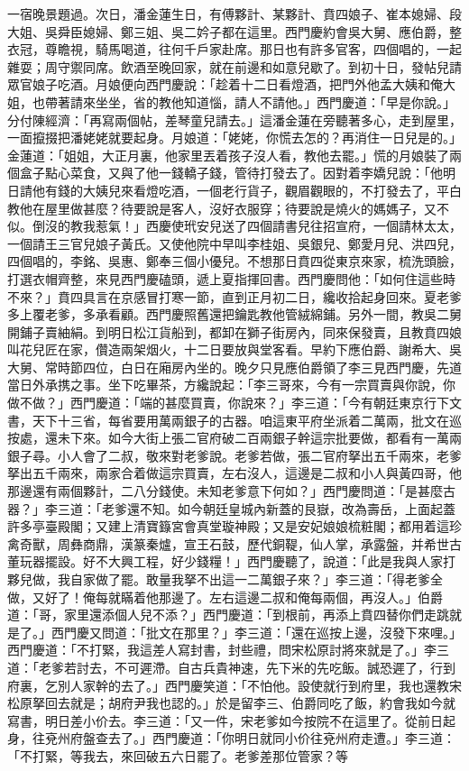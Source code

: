 \begin{showcontents}{}
一宿晚景題過。次日，潘金蓮生日，有傅夥計、某夥計、賁四娘子、崔本媳婦、段大姐、吳舜臣媳婦、鄭三姐、吳二妗子都在這里。西門慶約會吳大舅、應伯爵，整衣冠，尊瞻視，騎馬喝道，往何千戶家赴席。那日也有許多官客，四個唱的，一起雜耍；周守禦同席。飲酒至晚回家，就在前邊和如意兒歇了。到初十日，發帖兒請眾官娘子吃酒。月娘便向西門慶說：「趁着十二日看燈酒，把門外他孟大姨和俺大姐，也帶著請來坐坐，省的教他知道惱，請人不請他。」西門慶道：「早是你說。」分付陳經濟：「再寫兩個帖，差琴童兒請去。」這潘金蓮在旁聽著多心，走到屋里，一面攛掇把潘姥姥就要起身。月娘道：「姥姥，你慌去怎的？再消住一日兒是的。」金蓮道：「姐姐，大正月裏，他家里丟着孩子沒人看，教他去罷。」慌的月娘裝了兩個盒子點心菜食，又與了他一錢轎子錢，管待打發去了。因對着李嬌兒說：「他明日請他有錢的大姨兒來看燈吃酒，一個老行貨子，觀眉觀眼的，不打發去了，平白教他在屋里做甚麼？待要說是客人，沒好衣服穿；待要說是燒火的媽媽子，又不似。倒沒的教我惹氣！」西慶使玳安兒送了四個請書兒往招宣府，一個請林太太，一個請王三官兒娘子黃氏。又使他院中早叫李桂姐、吳銀兒、鄭愛月兒、洪四兒，四個唱的，李銘、吳惠、鄭奉三個小優兒。不想那日賁四從東京來家，梳洗頭臉，打選衣帽齊整，來見西門慶磕頭，遞上夏指揮回書。西門慶問他：「如何住這些時不來？」賁四具言在京感冒打寒一節，直到正月初二日，纔收拾起身回來。夏老爹多上覆老爹，多承看顧。西門慶照舊還把鑰匙教他管絨綿鋪。另外一間，教吳二舅開鋪子賣紬絹。到明日松江貨船到，都卸在獅子街房內，同來保發賣，且教賁四娘叫花兒匠在家，儹造兩架烟火，十二日要放與堂客看。早約下應伯爵、謝希大、吳大舅、常時節四位，白日在廂房內坐的。晚夕只見應伯爵領了李三見西門慶，先道當日外承携之事。坐下吃畢茶，方纔說起：「李三哥來，今有一宗買賣與你說，你做不做？」西門慶道：「端的甚麼買賣，你說來？」李三道：「今有朝廷東京行下文書，天下十三省，每省要用萬兩銀子的古器。咱這東平府坐派着二萬兩，批文在巡按處，還未下來。如今大街上張二官府破二百兩銀子幹這宗批要做，都看有一萬兩銀子尋。小人會了二叔，敬來對老爹說。老爹若做，張二官府拏出五千兩來，老爹拏出五千兩來，兩家合着做這宗買賣，左右沒人，這邊是二叔和小人與黃四哥，他那邊還有兩個夥計，二八分錢使。未知老爹意下何如？」西門慶問道：「是甚麼古器？」李三道：「老爹還不知。如今朝廷皇城內新蓋的艮嶽，改為壽岳，上面起蓋許多亭臺殿閣；又建上清寶籙宮會真堂璇神殿；又是安妃娘娘梳粧閣；都用着這珍禽奇獸，周彝商鼎，漢篆秦爐，宣王石鼓，歷代銅鞮，仙人掌，承露盤，并希世古董玩器擺設。好不大興工程，好少錢糧！」西門慶聽了，說道：「此是我與人家打夥兒做，我自家做了罷。敢量我拏不出這一二萬銀子來？」李三道：「得老爹全做，又好了！俺每就瞞着他那邊了。左右這邊二叔和俺每兩個，再沒人。」伯爵道：「哥，家里還添個人兒不添？」西門慶道：「到根前，再添上賁四替你們走跳就是了。」西門慶又問道：「批文在那里？」李三道：「還在巡按上邊，沒發下來哩。」西門慶道：「不打緊，我這差人寫封書，封些禮，問宋松原討將來就是了。」李三道：「老爹若討去，不可遲滯。自古兵貴神速，先下米的先吃飯。誠恐遲了，行到府裏，乞別人家幹的去了。」西門慶笑道：「不怕他。設使就行到府里，我也還教宋松原拏回去就是；胡府尹我也認的。」於是留李三、伯爵同吃了飯，約會我如今就寫書，明日差小价去。李三道：「又一件，宋老爹如今按院不在這里了。從前日起身，往兗州府盤查去了。」西門慶道：「你明日就同小价往兗州府走遭。」李三道：「不打緊，等我去，來回破五六日罷了。老爹差那位管家？等
\end{showcontents}
